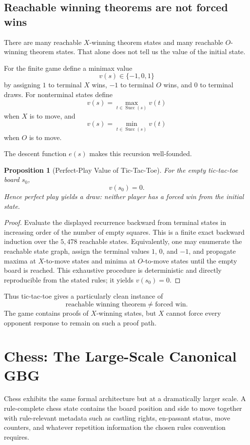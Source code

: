 \documentclass[11pt]{article}
\newtheorem{proposition}[theorem]{Proposition}
\theoremstyle{definition}
\theoremstyle{remark}
\newcommand{\Succ}{\operatorname{Succ}}
\begin{document}
\subsection{Reachable winning theorems are not forced wins}

There are many reachable $X$-winning theorem states and many reachable $O$-winning theorem states. That alone does not tell us the value of the initial state.

For the finite game define a minimax value
\[
v(s)\in\{-1,0,1\}
\]
by assigning $1$ to terminal $X$ wins, $-1$ to terminal $O$ wins, and $0$ to terminal draws. For nonterminal states define
\[
v(s)=\max_{t\in\Succ(s)}v(t)
\]
when $X$ is to move, and
\[
v(s)=\min_{t\in\Succ(s)}v(t)
\]
when $O$ is to move.

The descent function $e(s)$ makes this recursion well-founded.

\begin{proposition}[Perfect-Play Value of Tic-Tac-Toe]
For the empty tic-tac-toe board $s_0$,
\[
\boxed{v(s_0)=0.}
\]
Hence perfect play yields a draw: neither player has a forced win from the initial state.
\end{proposition}

\begin{proof}
Evaluate the displayed recurrence backward from terminal states in increasing order of the number of empty squares. This is a finite exact backward induction over the $5,478$ reachable states. Equivalently, one may enumerate the reachable state graph, assign the terminal values $1$, $0$, and $-1$, and propagate maxima at $X$-to-move states and minima at $O$-to-move states until the empty board is reached. This exhaustive procedure is deterministic and directly reproducible from the stated rules; it yields $v(s_0)=0$.
\end{proof}

Thus tic-tac-toe gives a particularly clean instance of
\[
\boxed{\text{reachable winning theorem}\neq\text{forced win}.}
\]
The game contains proofs of $X$-winning states, but $X$ cannot force every opponent response to remain on such a proof path.

\section{Chess: The Large-Scale Canonical GBG}

Chess exhibits the same formal architecture but at a dramatically larger scale. A rule-complete chess state contains the board position and side to move together with rule-relevant metadata such as castling rights, en-passant status, move counters, and whatever repetition information the chosen rules convention requires.
\end{document}
